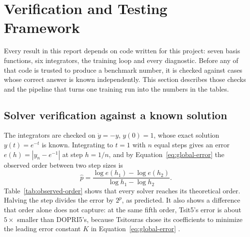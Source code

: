 \section{Verification and Testing Framework}
\label{sec:verification}

Every result in this report depends on code written for this project: seven
basis functions, six integrators, the training loop and every diagnostic.
Before any of that code is trusted to produce a benchmark number, it is
checked against cases whose correct answer is known independently. This
section describes those checks and the pipeline that turns one training run
into the numbers in the tables.

\subsection{Solver verification against a known solution}

The integrators are checked on $\dot y=-y$, $y(0)=1$, whose exact solution
$y(t)=e^{-t}$ is known. Integrating to $t=1$ with $n$ equal steps gives an
error $e(h)=|y_n-e^{-1}|$ at step $h=1/n$, and by
Equation~\ref{eq:global-error} the observed order between two step sizes is
\begin{equation}
\hat p=\frac{\log e(h_1)-\log e(h_2)}{\log h_1-\log h_2}.
\label{eq:observed-order}
\end{equation}
Table~\ref{tab:observed-order} shows that every solver reaches its
theoretical order. Halving the step divides the error by $2^{p}$, as
predicted. It also shows a difference that order alone does not capture: at
the same fifth order, Tsit5's error is about $5\times$ smaller than
DOPRI5's, because Tsitouras chose its coefficients to minimize the leading
error constant $K$ in Equation~\ref{eq:global-error}
\cite{tsitouras2011tsit5}.

